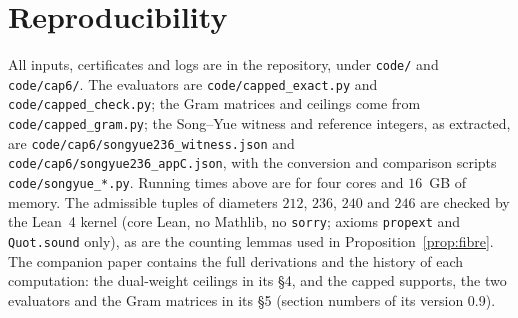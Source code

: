 \documentclass[11pt]{amsart}
\theoremstyle{definition}
\theoremstyle{remark}
\begin{document}
\section{Reproducibility}
All inputs, certificates and logs are in the repository, under
\texttt{code/} and \texttt{code/cap6/}. The evaluators are
\texttt{code/capped\_exact.py} and \texttt{code/capped\_check.py}; the Gram
matrices and ceilings come from \texttt{code/capped\_gram.py}; the Song--Yue
witness and reference integers, as extracted, are
\texttt{code/cap6/songyue236\_witness.json} and
\texttt{code/cap6/songyue236\_appC.json}, with the conversion and comparison
scripts \texttt{code/songyue\_*.py}. Running times above are for four cores
and $16$~GB of memory. The admissible tuples of diameters $212$, $236$, $240$
and $246$ are checked by the Lean~4 kernel (core Lean, no Mathlib, no
\texttt{sorry}; axioms \texttt{propext} and \texttt{Quot.sound} only), as are
the counting lemmas used in Proposition~\ref{prop:fibre}. The companion paper
\cite{Kim26} contains the full derivations and the history of each
computation: the dual-weight ceilings in its \S4, and the capped supports,
the two evaluators and the Gram matrices in its \S5 (section numbers of its
version 0.9).
\end{document}

